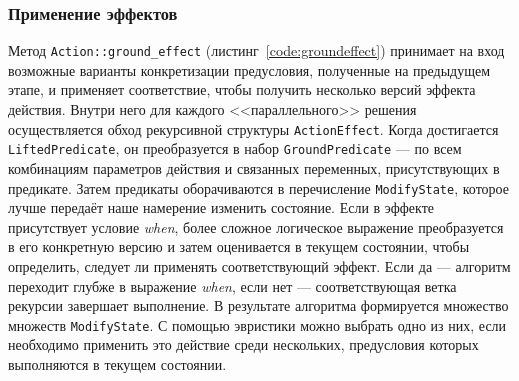 \documentclass{article}
\begin{document}
\subsubsection{Применение эффектов}

Метод \texttt{Action::ground\_effect} (листинг~\ref{code:groundeffect}) принимает на вход возможные варианты конкретизации предусловия,
полученные на предыдущем этапе, и применяет соответствие, чтобы получить несколько версий эффекта действия.
Внутри него для каждого <<параллельного>> решения осуществляется обход рекурсивной структуры \texttt{ActionEffect}.
Когда достигается \texttt{LiftedPredicate}, он преобразуется в набор \texttt{GroundPredicate} ---
по всем комбинациям параметров действия и связанных переменных, присутствующих в предикате.
Затем предикаты оборачиваются в перечисление \texttt{ModifyState}, которое лучше передаёт наше намерение изменить состояние.
Если в эффекте присутствует условие \textit{when},
более сложное логическое выражение преобразуется в его конкретную версию и затем оценивается в текущем состоянии,
чтобы определить, следует ли применять соответствующий эффект.
Если да --- алгоритм переходит глубже в выражение \textit{when},
если нет --- соответствующая ветка рекурсии завершает выполнение.
В результате алгоритма формируется множество множеств \texttt{ModifyState}.
С помощью эвристики можно выбрать одно из них,
если необходимо применить это действие среди нескольких,
предусловия которых выполняются в текущем состоянии.
\end{document}
